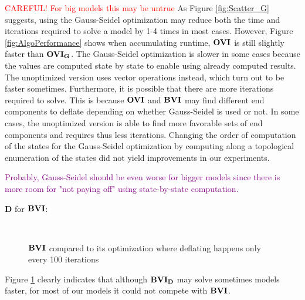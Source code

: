 \textcolor{red}{CAREFUL! For big models this may be untrue}
As Figure \ref{fig:Scatter_G} suggests, using the Gauss-Seidel optimization may reduce both the time and iterations required to solve a model by 1-4 times in most cases.
However, Figure \ref{fig:AlgoPerformance} shows when accumulating runtime, $\mathbf{OVI}$ is still slightly faster than $\mathbf{OVI_G}$.
The Gauss-Seidel optimization is slower in some cases because the values are computed state by state to enable using already computed results.
The unoptimized version uses vector operations instead, which turn out to be faster sometimes.
Furthermore, it is possible that there are more iterations required to solve. 
This is because $\mathbf{OVI}$ and $\mathbf{BVI}$ may find different end components to deflate depending on whether Gauss-Seidel is used or not.
In some cases, the unoptimized version is able to find more favorable sets of end components and requires thus less iterations.
Changing the order of computation of the states for the Gauss-Seidel optimization by computing along a topological enumeration of the states did not
yield improvements in our experiments.  

\textcolor{purple}{Probably, Gauss-Seidel should be even worse for bigger models since there is more room for "not paying off" using state-by-state computation.}


$\mathbf{D}$ for $\mathbf{BVI}$:
\begin{figure}[h!]
    \centering
    \
    \caption{$\mathbf{BVI}$ compared to its optimization where deflating happens only every 100 iterations}%
    \label{fig:Scatter_D}%
    \end{figure}
\FloatBarrier
Figure \ref{fig:Scatter_D} clearly indicates that although $\mathbf{BVI_D}$ may solve sometimes models faster, 
for most of our models it could not compete with $\mathbf{BVI}$.


